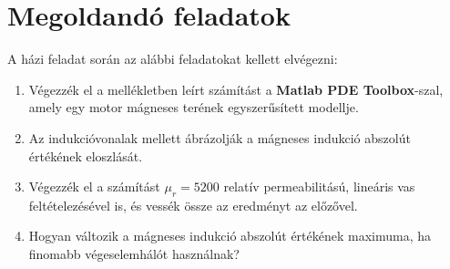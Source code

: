 \chapter{Megoldandó feladatok}\label{sect:LatexTools}
A házi feladat során az alábbi feladatokat kellett elvégezni:
\begin{enumerate}
	\item Végezzék el a mellékletben leírt számítást a \textbf{Matlab PDE Toolbox}-szal, amely egy motor mágneses terének egyszerűsített modellje.
	\item Az indukcióvonalak mellett ábrázolják a mágneses indukció abszolút értékének eloszlását.
	\item Végezzék el a számítást $ \mu_{r}=5200 $ relatív permeabilitású, lineáris vas feltételezésével is, és vessék össze az eredményt az előzővel. 
	\item Hogyan változik a mágneses indukció abszolút értékének maximuma, ha finomabb végeselemhálót használnak?
\end{enumerate}
